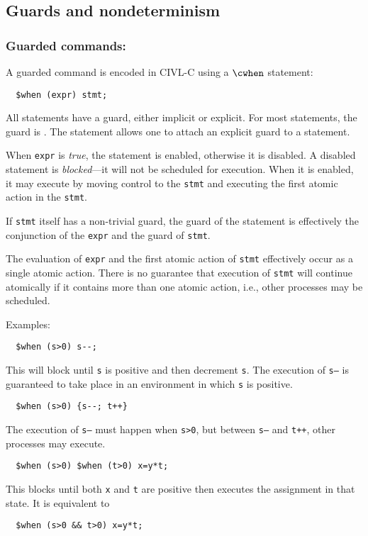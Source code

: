 \subsection{Guards and nondeterminism}

\subsubsection{Guarded commands: \cwhen}

A guarded command is encoded in CIVL-C using a $\cwhen$ statement:
\begin{verbatim}
  $when (expr) stmt;
\end{verbatim}
All statements have a guard, either implicit or explicit.  For most
statements, the guard is \ctrue.  The \cwhen{} statement allows one to
attach an explicit guard to a statement.

When \texttt{expr} is \emph{true}, the statement is enabled, otherwise
it is disabled.  A disabled statement is \emph{blocked}---it will not
be scheduled for execution.  When it is enabled, it may execute by
moving control to the \texttt{stmt} and executing the first atomic
action in the \texttt{stmt}.

If \texttt{stmt} itself has a non-trivial guard, the guard of the
\cwhen{} statement is effectively the conjunction of the \texttt{expr}
and the guard of \texttt{stmt}.

The evaluation of \texttt{expr} and the first atomic action of
\texttt{stmt} effectively occur as a single atomic action.  There is
no guarantee that execution of \texttt{stmt} will continue atomically
if it contains more than one atomic action, i.e., other processes may
be scheduled.

Examples:
\begin{verbatim}
  $when (s>0) s--;
\end{verbatim}
This will block until \texttt{s} is positive and then decrement
\texttt{s}.  The execution of \texttt{s--} is guaranteed to take place
in an environment in which \texttt{s} is positive.

\begin{verbatim}
  $when (s>0) {s--; t++}
\end{verbatim}
The execution of \texttt{s--} must happen when \texttt{s>0}, but
between \texttt{s--} and \texttt{t++}, other processes may execute.

\begin{verbatim}
  $when (s>0) $when (t>0) x=y*t;
\end{verbatim}
This blocks until both \texttt{x} and \texttt{t} are positive then
executes the assignment in that state.  It is equivalent to
\begin{verbatim}
  $when (s>0 && t>0) x=y*t;
\end{verbatim}

